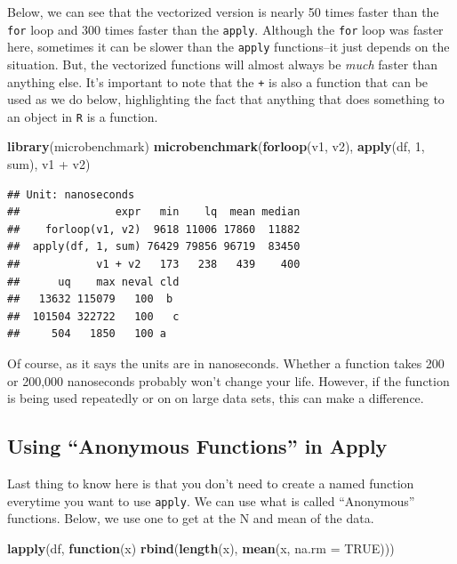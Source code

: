 \documentclass[]{tufte-book}
\newenvironment{Shaded}{}{}
\newcommand{\KeywordTok}[1]{\textcolor[rgb]{0.00,0.44,0.13}{\textbf{#1}}}
\newcommand{\DataTypeTok}[1]{\textcolor[rgb]{0.56,0.13,0.00}{#1}}
\newcommand{\DecValTok}[1]{\textcolor[rgb]{0.25,0.63,0.44}{#1}}
\newcommand{\StringTok}[1]{\textcolor[rgb]{0.25,0.44,0.63}{#1}}
\newcommand{\OtherTok}[1]{\textcolor[rgb]{0.00,0.44,0.13}{#1}}
\newcommand{\ControlFlowTok}[1]{\textcolor[rgb]{0.00,0.44,0.13}{\textbf{#1}}}
\newcommand{\OperatorTok}[1]{\textcolor[rgb]{0.40,0.40,0.40}{#1}}
\newcommand{\NormalTok}[1]{#1}
\theoremstyle{definition}
\theoremstyle{definition}
\theoremstyle{remark}
\begin{document}
Below, we can see that the vectorized version is nearly 50 times faster
than the \texttt{for} loop and 300 times faster than the \texttt{apply}.
Although the \texttt{for} loop was faster here, sometimes it can be
slower than the \texttt{apply} functions--it just depends on the
situation. But, the vectorized functions will almost always be
\emph{much} faster than anything else. It's important to note that the
\texttt{+} is also a function that can be used as we do below,
highlighting the fact that anything that does something to an object in
\texttt{R} is a function.

\begin{Shaded}
\begin{Highlighting}[]
\KeywordTok{library}\NormalTok{(microbenchmark)}
\KeywordTok{microbenchmark}\NormalTok{(}\KeywordTok{forloop}\NormalTok{(v1, v2), }\KeywordTok{apply}\NormalTok{(df, }\DecValTok{1}\NormalTok{, sum), }
\NormalTok{    v1 }\OperatorTok{+}\StringTok{ }\NormalTok{v2)}
\end{Highlighting}
\end{Shaded}

\begin{verbatim}
## Unit: nanoseconds
##               expr   min    lq  mean median
##    forloop(v1, v2)  9618 11006 17860  11882
##  apply(df, 1, sum) 76429 79856 96719  83450
##            v1 + v2   173   238   439    400
##      uq    max neval cld
##   13632 115079   100  b 
##  101504 322722   100   c
##     504   1850   100 a
\end{verbatim}

Of course, as it says the units are in nanoseconds. Whether a function
takes 200 or 200,000 nanoseconds probably won't change your life.
However, if the function is being used repeatedly or on on large data
sets, this can make a difference.

\subsection*{\texorpdfstring{Using ``Anonymous Functions'' in
Apply}{Using Anonymous Functions in Apply}}\label{using-anonymous-functions-in-apply}

Last thing to know here is that you don't need to create a named
function everytime you want to use \texttt{apply}. We can use what is
called ``Anonymous'' functions. Below, we use one to get at the N and
mean of the data.

\begin{Shaded}
\begin{Highlighting}[]
\KeywordTok{lapply}\NormalTok{(df, }\ControlFlowTok{function}\NormalTok{(x) }\KeywordTok{rbind}\NormalTok{(}\KeywordTok{length}\NormalTok{(x), }\KeywordTok{mean}\NormalTok{(x, }
    \DataTypeTok{na.rm =} \OtherTok{TRUE}\NormalTok{)))}
\end{Highlighting}
\end{Shaded}
\end{document}
